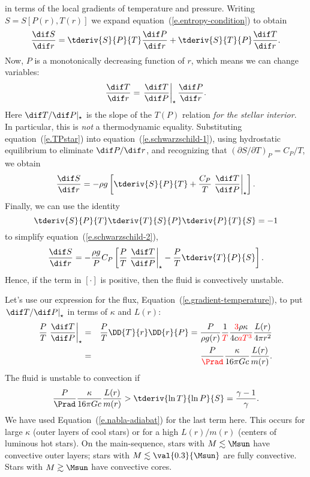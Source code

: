  in terms of the local gradients of temperature and pressure. Writing $S = S[P(r),T(r)]$ we expand equation~(\ref{e.entropy-condition}) to obtain
\begin{equation}\label{e.schwarzschild-1}
\frac{\dif S}{\dif r} = \tderiv{S}{P}{T} \frac{\dif P}{\dif r} + \tderiv{S}{T}{P}\frac{\dif T}{\dif r} .
\end{equation}
Now, $P$ is a monotonically decreasing function of $r$, which means we can change variables:
\begin{equation}\label{e.TPstar}
\frac{\dif T}{\dif r} = \TPstar \frac{\dif P}{\dif r} .
\end{equation}
Here $\dif T/\dif P|_{\star}$ is the slope of the $T(P)$ relation \emph{for the stellar interior}.  In particular, this is \emph{not} a thermodynamic equality. Substituting equation~(\ref{e.TPstar}) into equation~(\ref{e.schwarzschild-1}), using hydrostatic equilibrium to eliminate $\dif P/\dif r$, and recognizing that $(\partial S/\partial T)_{P} = C_{P}/T$, we obtain
\begin{equation}\label{e.schwarzschild-2}
\frac{\dif S}{\dif r} =  -\rho g\left[\tderiv{S}{P}{T} + \frac{C_{P}}{T} \TPstar \right].
\end{equation}
Finally, we can use the identity
\begin{equation}
\tderiv{S}{P}{T}\tderiv{T}{S}{P}\tderiv{P}{T}{S} = -1
\end{equation}
to simplify equation~(\ref{e.schwarzschild-2}),
\begin{equation}
\frac{\dif S}{\dif r} = -\frac{\rho g}{P}C_{P}\left[\frac{P}{T}\TPstar - \frac{P}{T}\tderiv{T}{P}{S}\right].
 \label{e.schwarzschild}
\end{equation}
Hence, if the term in $\left[\cdot\right]$ is positive, then the fluid is convectively unstable.

Let's use our expression for the flux, Equation~(\ref{e.gradient-temperature}), to put $\left.\dif T/\dif P\right|_\star$ in terms of $\kappa$ and $L(r)$:
\begin{eqnarray}
    \frac{P}{T}\TPstar &=& \frac{P}{T}\DD{T}{r}\DD{r}{P} = \frac{P}{\rho g(r)}\frac{1}{\color{red}T}\frac{{\color{red}3}\rho\kappa}{4c {\color{red}a T^3}}\frac{L(r)}{4\pi r^2} \nonumber\\
    &=& \frac{P}{\color{red}\Prad}\frac{\kappa}{16\pi Gc} \frac{L(r)}{m(r)}.
\end{eqnarray}
The fluid is unstable to convection if
\begin{equation}
    \frac{P}{\Prad}\frac{\kappa}{16\pi Gc}\frac{L(r)}{m(r)} > \tderiv{\ln T}{\ln P}{S}  = \frac{\gamma -1}{\gamma}.
\end{equation}
We have used Equation~(\ref{e.nabla-adiabat}) for the last term here.
This occurs for large $\kappa$ (outer layers of cool stars) or for a high $L(r)/m(r)$ (centers of luminous hot stars).  On the main-sequence, stars with $M \lesssim \Msun$ have convective outer layers; stars with $M \lesssim \val{0.3}{\Msun}$ are fully convective. Stars with $M\gtrsim\Msun$ have convective cores.


